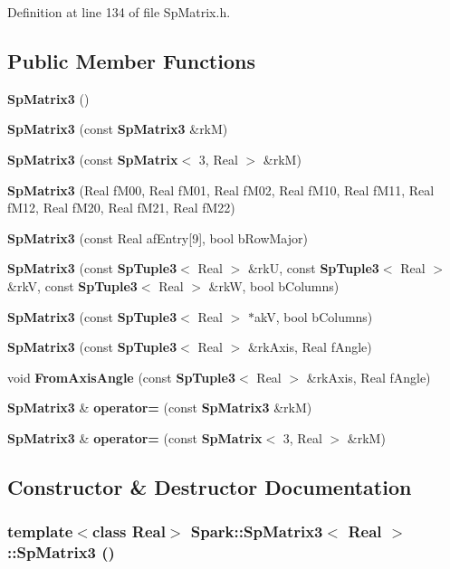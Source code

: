 Definition at line 134 of file Sp\-Matrix.h.\subsection*{Public Member Functions}
\begin{CompactItemize}
\item 
{\bf Sp\-Matrix3} ()
\item 
{\bf Sp\-Matrix3} (const {\bf Sp\-Matrix3} \&rk\-M)
\item 
{\bf Sp\-Matrix3} (const {\bf Sp\-Matrix}$<$ 3, Real $>$ \&rk\-M)
\item 
{\bf Sp\-Matrix3} (Real f\-M00, Real f\-M01, Real f\-M02, Real f\-M10, Real f\-M11, Real f\-M12, Real f\-M20, Real f\-M21, Real f\-M22)
\item 
{\bf Sp\-Matrix3} (const Real af\-Entry[9], bool b\-Row\-Major)
\item 
{\bf Sp\-Matrix3} (const {\bf Sp\-Tuple3}$<$ Real $>$ \&rk\-U, const {\bf Sp\-Tuple3}$<$ Real $>$ \&rk\-V, const {\bf Sp\-Tuple3}$<$ Real $>$ \&rk\-W, bool b\-Columns)
\item 
{\bf Sp\-Matrix3} (const {\bf Sp\-Tuple3}$<$ Real $>$ $\ast$ak\-V, bool b\-Columns)
\item 
{\bf Sp\-Matrix3} (const {\bf Sp\-Tuple3}$<$ Real $>$ \&rk\-Axis, Real f\-Angle)
\item 
void {\bf From\-Axis\-Angle} (const {\bf Sp\-Tuple3}$<$ Real $>$ \&rk\-Axis, Real f\-Angle)
\item 
{\bf Sp\-Matrix3} \& {\bf operator=} (const {\bf Sp\-Matrix3} \&rk\-M)
\item 
{\bf Sp\-Matrix3} \& {\bf operator=} (const {\bf Sp\-Matrix}$<$ 3, Real $>$ \&rk\-M)
\end{CompactItemize}


\subsection{Constructor \& Destructor Documentation}
\subsubsection{\setlength{\rightskip}{0pt plus 5cm}template$<$class Real$>$ {\bf Spark::Sp\-Matrix3}$<$ Real $>$::{\bf Sp\-Matrix3} ()}\label{classSpark_1_1SpMatrix3_a0}


